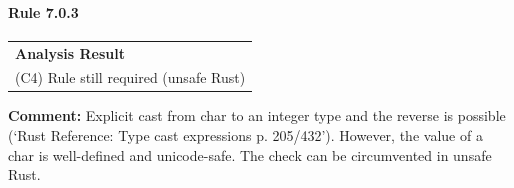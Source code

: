 \paragraph{Rule 7.0.3}
\begin{longtable}{p{13cm}}
\textbf{Analysis Result} \\
(C4) Rule still required (unsafe Rust) \\
\end{longtable}
\textbf{Comment:} Explicit cast from char to an integer type and the reverse is possible (`Rust Reference: Type cast expressions p. 205/432'). However, the value of a char is well-defined and unicode-safe. The check can be circumvented in unsafe Rust. \\
